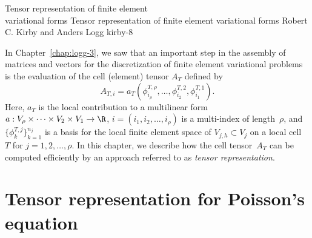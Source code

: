               {Tensor representation of finite element \\ variational forms}
              {Tensor representation of finite element variational forms}
              {Robert C. Kirby and Anders Logg}
              {kirby-8}

In Chapter~\ref{chap:logg-3}, we saw that an important step in the
assembly of matrices and vectors for the discretization of finite
element variational problems is the evaluation of the cell (element)
tensor $A_T$ defined by
\begin{equation}
  A_{T,i}
  = a_T(\phi^{T,\rho}_{i_{\rho}}, \ldots, \phi^{T,2}_{i_2}, \phi^{T,1}_{i_1}).
\end{equation}
Here, $a_T$ is the local contribution to a multilinear form $a:
V_{\rho} \times \cdots \times V_2 \times V_1 \rightarrow \R$,
$i=(i_1,i_2,\dots,i_\rho)$ is a multi-index of length~$\rho$, and
$\{\phi^{T,j}_k\}_{k=1}^{n_j}$ is a basis for the local finite element
space of $V_{j,h} \subset V_j$ on a local cell~$T$ for $j =
1,2,\ldots,\rho$. In this chapter, we describe how the cell
tensor~$A_T$ can be computed efficiently by an approach referred to as
\emph{tensor representation}.

\section{Tensor representation for Poisson's equation}

